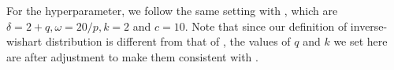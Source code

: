 \documentclass[]{book}
\begin{document}
For the hyperparameter, we follow the same setting with \citep{Brown}, which are \(\delta = 2+q, \omega = 20/p, k = 2\) and \(c = 10\). Note that since our definition of inverse-wishart distribution is different from that of \citep{Brown}, the values of \(q\) and \(k\) we set here are after adjustment to make them consistent with \citep{Brown}.


\end{document}
